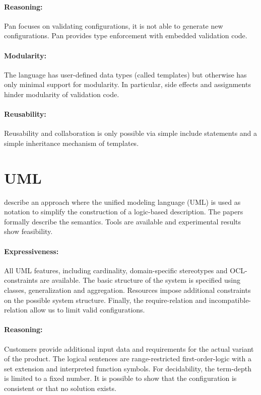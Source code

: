 \paragraph*{Reasoning:}
Pan focuses on validating configurations, it is not able to generate new configurations.
Pan provides type enforcement with embedded validation code.

\paragraph*{Modularity:}
The language has user-defined data types (called templates) but otherwise has only minimal support for modularity.
In particular, side effects and assignments hinder modularity of validation code.

\paragraph*{Reusability:}
Reusability and collaboration is only possible via simple include statements and a simple inheritance mechanism of templates.


\section{UML}

\citet{felfernig1999knowledge,felfernig2000uml,felfernig2002joint} describe an approach where the unified modeling language (UML) is used as notation to simplify the construction of a logic-based description.
The papers formally describe the semantics. Tools are available and experimental results show feasibility.

\paragraph*{Expressiveness:}
All UML features, including cardinality, domain-specific stereotypes and OCL-constraints are available.
The basic structure of the system is specified using classes, generalization and aggregation.
Resources impose additional constraints on the possible system structure.
Finally, the require-relation and incompatible-relation allow us to limit valid configurations.

\paragraph*{Reasoning:}
Customers provide additional input data and requirements for the actual variant of the product.
The logical sentences are range-restricted first-order-logic with a set extension and interpreted function symbols.
For decidability, the term-depth is limited to a fixed number.
It is possible to show that the configuration is consistent or that no solution exists.

